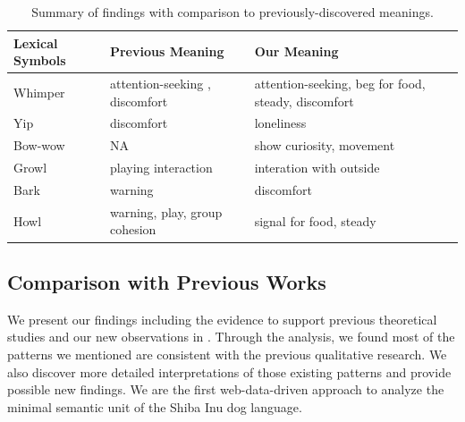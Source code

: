 
\begin{table}[t]
\small
\centering
\begin{tabular}{p{}|p{}|p{}}
\toprule
\textbf{Lexical Symbols} & \textbf{Previous Meaning} & \textbf{Our Meaning}\\
\hline
Whimper & attention-seeking \cite{handelman2012canine},
				discomfort \cite{web2018dog} & attention-seeking, beg for food, steady, discomfort \\
\hline
Yip & discomfort ~\cite{web2018yip} & loneliness \\
\hline
Bow-wow & NA & show curiosity, movement\\
\hline
Growl & playing interaction ~\cite{handelman2012canine} & interation with outside \\
\hline
Bark & warning \cite{handelman2012canine} & discomfort \\
\hline
Howl & warning, play, group cohesion ~\cite{ani8080131} & signal for food, steady \\
\bottomrule
\end{tabular}
\caption{Summary of findings with comparison to previously-discovered meanings.}
\label{tab:finding}
\end{table}




\subsection{Comparison with Previous Works}
We present our findings including the evidence to support previous theoretical studies and our new observations in .
Through the analysis, we found most of the patterns we mentioned are consistent with the previous qualitative research. We also discover more detailed interpretations of those existing patterns and provide possible new findings. We are the first web-data-driven approach to analyze the minimal semantic unit of the Shiba Inu dog language.  

